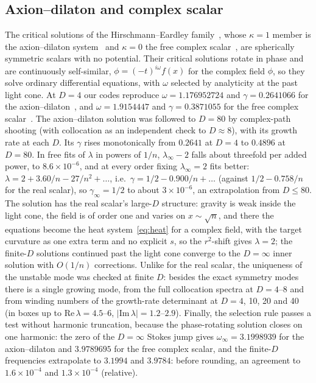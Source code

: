 \documentclass[aps,prd,onecolumn,superscriptaddress,nofootinbib,10pt]{revtex4-2}
\begin{document}
\subsection{Axion--dilaton and complex scalar}

The critical solutions of the Hirschmann--Eardley family~\cite{HirschmannEardley1997}, whose $\kappa = 1$ member is the
axion--dilaton system~\cite{HamadeHorneStewart1996} and $\kappa = 0$ the free complex scalar~\cite{HirschmannEardley1995a},
are spherically symmetric scalars with no potential. Their critical solutions rotate in phase and are continuously
self-similar, $\phi = (-t)^{i\omega}f(x)$ for the complex field $\phi$, so they solve ordinary differential equations, with $\omega$ selected by
analyticity at the past light cone. At $D = 4$ our codes reproduce $\omega = 1.176952724$ and $\gamma = 0.2641066$ for the
axion--dilaton~\cite{HamadeHorneStewart1996}, and $\omega = 1.9154447$ and $\gamma = 0.3871055$ for the free complex
scalar~\cite{HirschmannEardley1995a,HirschmannEardley1995b}. The axion--dilaton solution was followed to $D = 80$ by
complex-path shooting (with collocation as an independent check to $D \approx 8$), with its growth rate at each $D$.
Its $\gamma$ rises monotonically from $0.2641$ at $D = 4$ to $0.4896$ at $D = 80$. In free fits of $\lambda$ in powers of
$1/n$, $\lambda_\infty - 2$ falls about threefold per added power, to $8.6\times10^{-6}$, and at every order fixing
$\lambda_\infty = 2$ fits better: $\lambda = 2 + 3.60/n - 27/n^2 + \dots$, i.e.\ $\gamma = 1/2 - 0.900/n + \dots$ (against
$1/2 - 0.758/n$ for the real scalar), so $\gamma_\infty = 1/2$ to about $3\times10^{-6}$, an extrapolation from $D \le 80$.
The solution has the real scalar's large-$D$ structure: gravity is weak inside the light cone, the field is of order one
and varies on $x \sim \sqrt n$, and there the equations become the heat system~\eqref{eq:heat} for a complex field, with
the target curvature as one extra term and no explicit $s$, so the $r^2$-shift gives $\lambda = 2$; the finite-$D$
solutions continued past the light cone converge to the $D = \infty$ inner solution with $O(1/n)$ corrections. Unlike
for the real scalar, the uniqueness of the unstable mode was checked at finite $D$: besides the exact symmetry modes
there is a single growing mode, from the full collocation spectra at $D = 4$--$8$ and from winding numbers of the
growth-rate determinant at $D = 4$, 10, 20 and 40 (in boxes up to $\mathrm{Re}\,\lambda = 4.5$--$6$,
$|\mathrm{Im}\,\lambda| = 1.2$--$2.9$). Finally, the selection rule passes a test without harmonic truncation, because the
phase-rotating solution closes on one harmonic: the zero of the $D = \infty$ Stokes jump gives
$\omega_\infty = 3.1998939$ for the axion--dilaton and $3.9789695$ for the free complex scalar, and the finite-$D$
frequencies extrapolate to $3.1994$ and $3.9784$: before rounding, an agreement to $1.6\times10^{-4}$ and
$1.3\times10^{-4}$ (relative).
\end{document}
